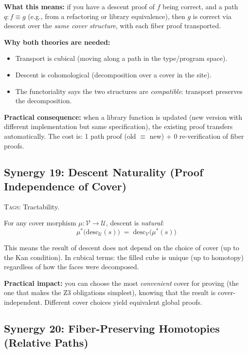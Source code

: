 \documentclass[11pt,a4paper]{article}
\theoremstyle{definition}
\theoremstyle{plain}
\newcommand{\covers}{\mathcal{U}}
\begin{document}
\textbf{What this means:} if you have a descent proof of
$f$ being correct, and a path $q : f \equiv g$ (e.g., from a
refactoring or library equivalence), then $g$ is correct via
descent over the \emph{same cover structure}, with each fiber
proof transported.

\textbf{Why both theories are needed:}
\begin{itemize}
\item Transport is cubical (moving along a path in the type/program
  space).
\item Descent is cohomological (decomposition over a cover in the
  site).
\item The functoriality says the two structures are \emph{compatible}:
  transport preserves the decomposition.
\end{itemize}

\textbf{Practical consequence:} when a library function is updated
(new version with different implementation but same specification),
the existing proof transfers automatically.  The cost is:
1 path proof (old $\equiv$ new) + 0 re-verification of fiber proofs.


\subsection{Synergy 19: Descent Naturality (Proof Independence of Cover)}
\label{sec:syn-naturality}

\textsc{Tags:} Tractability.

\medskip\noindent
For any cover morphism $\mu : \mathcal{V} \to \covers$, descent
is \emph{natural}:
\[
  \mu^*\bigl(\mathrm{desc}_\covers(s)\bigr)
  \;=\;
  \mathrm{desc}_\mathcal{V}\bigl(\mu^*(s)\bigr)
\]

This means the result of descent does not depend on the choice of
cover (up to the Kan condition).  In cubical terms: the filled cube
is unique (up to homotopy) regardless of how the faces were
decomposed.

\textbf{Practical impact:} you can choose the most \emph{convenient}
cover for proving (the one that makes the Z3 obligations simplest),
knowing that the result is cover-independent.  Different
cover choices yield equivalent global proofs.


\subsection{Synergy 20: Fiber-Preserving Homotopies (Relative Paths)}
\label{sec:syn-relative-paths}
\end{document}
